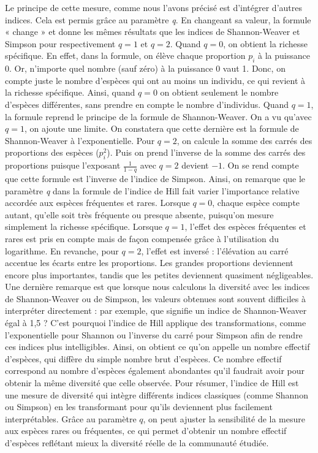 \documentclass[a4paper,twoside,12pt]{book}
\begin{document}
Le principe de cette mesure, comme nous l'avons précisé est d'intégrer d'autres indices. Cela est permis grâce au paramètre \textit{q}. En changeant sa valeur, la formule « change » et donne les mêmes résultats que les indices de Shannon-Weaver et Simpson pour respectivement \( q = 1\) et \( q = 2 \).
Quand \( q = 0 \), on obtient la richesse spécifique. En effet, dans la formule, on élève chaque proportion \( p_i \) à la puissance 0. Or, n’importe quel nombre (sauf zéro) à la puissance 0 vaut 1. Donc, on compte juste le nombre d’espèces qui ont au moins un individu, ce qui revient à la richesse spécifique. Ainsi, quand  \( q = 0 \) on obtient seulement le nombre d'espèces différentes, sans prendre en compte le nombre d'individus.
Quand \( q = 1 \), la formule reprend le principe de la formule de Shannon-Weaver. On a vu qu'avec  \( q = 1\), on ajoute une limite. On constatera que cette dernière est la formule de Shannon-Weaver à l'exponentielle.
 Pour \( q = 2 \), on calcule la somme des carrés des proportions des espèces (\( p_i^2 \)). Puis on prend l'inverse de la somme des carrés des proportions puisque l’exposant \(\frac{1}{1 - q}\) avec \(q = 2\)    devient \(-1\). On se rend compte que cette formule est l'inverse de l'indice de Simpson. Ainsi, on remarque que le paramètre \textit{q} dans la formule de l’indice de Hill fait varier l’importance relative accordée aux espèces fréquentes et rares. Lorsque \( q = 0 \), chaque espèce compte autant, qu’elle soit très fréquente ou presque absente, puisqu’on mesure simplement la richesse spécifique. Lorsque \( q = 1 \), l’effet des espèces fréquentes et rares est pris en compte mais de façon compensée grâce à l’utilisation du logarithme. En revanche, pour \( q = 2 \), l’effet est inversé : l’élévation au carré accentue les écarts entre les proportions. Les grandes proportions deviennent encore plus importantes, tandis que les petites deviennent quasiment négligeables.
 Une dernière remarque est que lorsque nous calculons la diversité avec les indices de Shannon-Weaver ou de Simpson, les valeurs obtenues sont souvent difficiles à interpréter directement : par exemple, que signifie un indice de Shannon-Weaver égal à 1,5 ? C'est pourquoi l'indice de Hill applique des transformations, comme l’exponentielle pour Shannon ou l’inverse du carré pour Simpson afin de rendre ces indices plus intelligibles. Ainsi, on obtient ce qu’on appelle un nombre effectif d’espèces, qui diffère du simple nombre brut d’espèces. Ce nombre effectif correspond au nombre d’espèces également abondantes qu’il faudrait avoir pour obtenir la même diversité que celle observée.
Pour résumer, l’indice de Hill est une mesure de diversité qui intègre différents indices classiques (comme Shannon ou Simpson) en les transformant pour qu’ils deviennent plus facilement interprétables. Grâce au paramètre \( q \), on peut ajuster la sensibilité de la mesure aux espèces rares ou fréquentes, ce qui permet d’obtenir un nombre effectif d’espèces reflétant mieux la diversité réelle de la communauté étudiée.
\end{document}
